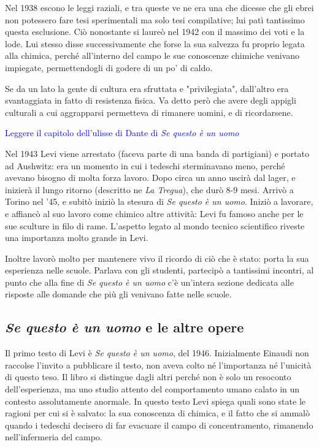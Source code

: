 \documentclass[a4paper, twoside, titlepage]{book}
\renewcommand{\emph}[1]{\textcolor{blue}{#1}}
\begin{document}
Nel 1938 escono le leggi raziali, e tra queste ve ne era una che dicesse che gli ebrei non potessero fare tesi sperimentali ma solo tesi compilative; lui patì tantissimo questa esclusione. Ciò nonostante si laureò nel 1942 con il massimo dei voti e la lode. Lui stesso disse successivamente che forse la sua salvezza fu proprio legata alla chimica, perché all'interno del campo le sue conoscenze chimiche venivano impiegate, permettendogli di godere di un po' di caldo.

Se da un lato la gente di cultura era sfruttata e "privilegiata", dall'altro era svantaggiata in fatto di resistenza fisica. Va detto però che avere degli appigli culturali a cui aggrapparsi permetteva di rimanere uomini, e di ricordarsene.

\emph{Leggere il capitolo dell'ulisse di Dante di \textit{Se questo è un uomo}}

Nel 1943 Levi viene arrestato (faceva parte di una banda di partigiani) e portato ad Aushwitz: era un momento in cui i tedeschi sterminavano meno, perché avevano bisogno di molta forza lavoro.
Dopo circa un anno uscirà dal lager, e inizierà il lungo ritorno (descritto ne \textit{La Tregua}), che durò 8-9 mesi. Arrivò a Torino nel '45, e subitò iniziò la stesura di \textit{Se questo è un uomo}.
Iniziò a lavorare, e affiancò al suo lavoro come chimico altre attività: Levi fu famoso anche per le sue sculture in filo di rame. L'aspetto legato al mondo tecnico scientifico riveste una importanza molto grande in Levi.

Inoltre lavorò molto per mantenere vivo il ricordo di ciò che è stato: porta la sua esperienza nelle scuole. Parlava con gli studenti, partecipò a tantissimi incontri, al punto che alla fine di \textit{Se questo è un uomo} c'è un'intera sezione dedicata alle risposte alle domande che più gli venivano fatte nelle scuole.

\subsection{\textit{Se questo è un uomo} e le altre opere}

Il primo testo di Levi è \textit{Se questo è un uomo}, del 1946. Inizialmente Einaudi non raccolse l'invito a pubblicare il testo, non aveva colto né l'importanza né l'unicità di questo teso. Il libro si distingue dagli altri perché non è solo un resoconto dell'esperienza, ma uno studio attento del comportamento umano calato in un contesto assolutamente anormale. In questo testo Levi spiega quali sono state le ragioni per cui si è salvato: la sua conoscenza di chimica, e il fatto che si ammalò quando i tedeschi decisero di far evacuare il campo di concentramento, rimanendo nell'infermeria del campo.
\end{document}
